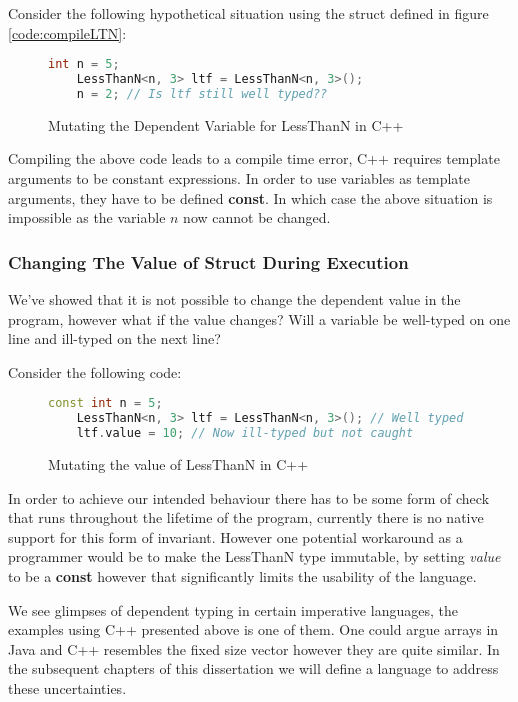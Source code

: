 \documentclass[a4paper,12pt]{report}
\begin{document}
\par
Consider the following hypothetical situation using the struct defined in 
figure \ref{code:compileLTN}: 

\begin{figure}[H]
  \begin{lstlisting}[language=c++]     
    int n = 5;
    LessThanN<n, 3> ltf = LessThanN<n, 3>();
    n = 2; // Is ltf still well typed??
  \end{lstlisting}
  \caption{Mutating the Dependent Variable for LessThanN in C++}
\end{figure}

\par
Compiling the above code leads to a compile time error, C++ requires template 
arguments to be constant expressions. In order to use variables as template 
arguments, they have to be defined \textbf{const}. In which case the above 
situation is impossible as the variable $n$ now cannot be changed. 

\subsubsection{Changing The Value of Struct During Execution}
We've showed that it is not possible to change the dependent value in 
the program, however what if the value changes? Will a 
variable be well-typed on one line and ill-typed on the next line? 

\par
Consider the following code: 
\begin{figure}[H]
  \begin{lstlisting}[language=c++]     
    const int n = 5;
    LessThanN<n, 3> ltf = LessThanN<n, 3>(); // Well typed
    ltf.value = 10; // Now ill-typed but not caught
  \end{lstlisting}
  \caption{Mutating the value of LessThanN in C++}
\end{figure}

\par
In order to achieve our intended behaviour there has to be some form of check 
that runs throughout the lifetime of the program, currently there is no native 
support for this form of invariant. However one potential workaround as a 
programmer would be to make the LessThanN type immutable, by setting \textit{value} 
to be a \textbf{const} however that significantly limits the usability of the 
language. 

\par
We see glimpses of dependent typing in certain imperative languages, the 
examples using C++ presented above is one of them. One could argue arrays in 
Java and C++ resembles the fixed size vector however they are quite similar. In 
the subsequent chapters of this dissertation we will define a language to 
address these uncertainties. 
\end{document}
